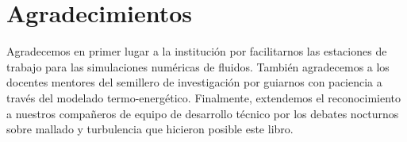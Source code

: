 \chapter*{Agradecimientos}

Agradecemos en primer lugar a la institución por facilitarnos las estaciones de trabajo para las simulaciones numéricas de fluidos.
También agradecemos a los docentes mentores del semillero de investigación por guiarnos con paciencia a través del modelado termo-energético.
Finalmente, extendemos el reconocimiento a nuestros compañeros de equipo de desarrollo técnico por los debates nocturnos sobre mallado y turbulencia que hicieron posible este libro.
